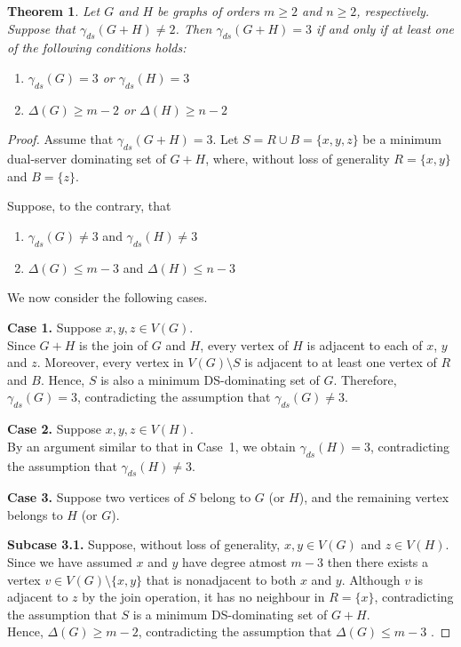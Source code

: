 \documentclass{article}
\newtheorem{theorem}{Theorem}[section]
\begin{document}
\begin{theorem}\label{DJP3}
Let $G$ and $H$ be graphs of orders $m \geq 2$ and $n \geq 2$, respectively. Suppose that $\gamma_{ds}(G+H) \neq  2$. Then $\gamma_{ds}(G+H)= 3$ if and only if at least one of the following conditions holds:
\begin{enumerate}
\item{$\gamma_{ds}(G)= 3$} or {$\gamma_{ds}(H)= 3$} 
\item{$\Delta(G) \geq m-2$} or {$\Delta(H) \geq n-2$}
\end{enumerate}
\end{theorem}
\begin{proof}
Assume that $
\gamma_{ds}(G+H)=3.$
Let $S=R\cup B=\{x,y,z\}$
be a minimum dual-server dominating set of $G+H$, where, without loss of generality $R=\{x,y\}$ and $ B=\{z\}$.

Suppose, to the contrary, that 
\begin{enumerate}
\item{$\gamma_{ds}(G)\neq 3$} and { $\gamma_{ds}(H)\neq 3$}
\item{$\Delta(G)\le m-3$} and {$\Delta(H)\le n-3$}
\end{enumerate}

We now consider the following cases.

\textbf{Case 1.} Suppose $x,y,z\in V(G)$. \\Since $G+H$ is the join of $G$ and $H$, every vertex of $H$ is adjacent to
each of $x$, $y$ and $z$. Moreover, every vertex in
$V(G)\setminus S$ is adjacent to at least one vertex of $R$ and  $B$. Hence, $S$ is also a minimum DS-dominating set of $G$. Therefore, $\gamma_{ds}(G)=3$, contradicting the assumption that
$\gamma_{ds}(G)\neq 3.$ 

\textbf{Case 2.} Suppose $x,y,z\in V(H)$.\\By an argument similar to that in Case~1, we obtain $\gamma_{ds}(H)=3$,
contradicting the assumption that $\gamma_{ds}(H)\neq 3.$ 

\textbf{Case 3.} Suppose two vertices of $S$ belong to $G$ (or $H$), and
the remaining vertex belongs to $H$ (or $G$).

\textbf{Subcase 3.1.} Suppose, without loss of generality, $x,y\in V(G)$ and $z\in V(H).$\\
Since we have assumed $x$ and $y$ have degree atmost $m-3$ then 
there exists a vertex $v\in V(G)\setminus\{x,y\}$
that is nonadjacent to both $x$ and $y$.
Although $v$ is adjacent to $z$ by the join operation, it has no neighbour
in
$R=\{x\}$,
contradicting the assumption that $S$ is a minimum DS-dominating set of $G+H$.\\
Hence, $\Delta(G)\ge m-2$, 
contradicting the assumption that $
\Delta(G)\le m-3$ .


\end{proof}
\end{document}
